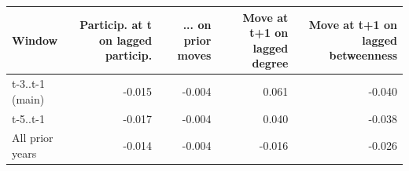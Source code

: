 \begin{tabular}{lrrrr}
\toprule
Window & Particip. at t on lagged particip. & ... on prior moves & Move at t+1 on lagged degree & Move at t+1 on lagged betweenness \\
\midrule
t-3..t-1 (main) & -0.015 & -0.004 & 0.061 & -0.040 \\
t-5..t-1 & -0.017 & -0.004 & 0.040 & -0.038 \\
All prior years & -0.014 & -0.004 & -0.016 & -0.026 \\
\bottomrule
\end{tabular}
\par{}
